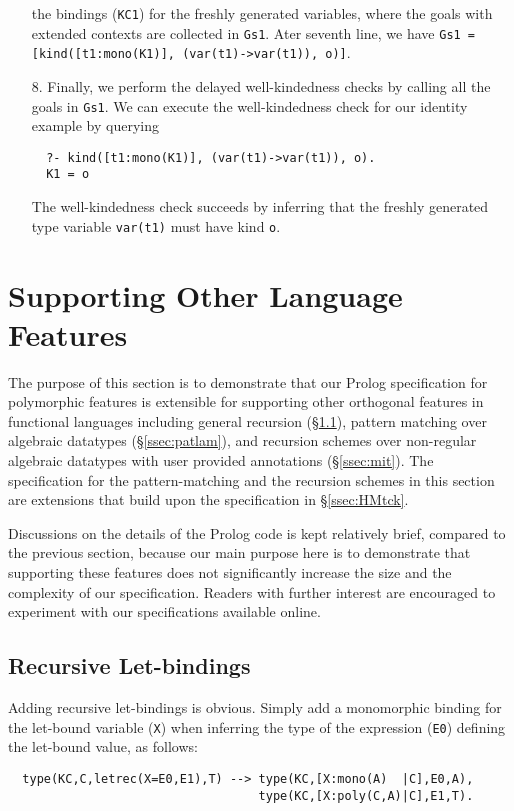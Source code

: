 \documentclass[runningheads,a4paper]{llncs}
\begin{document}
\begin{itemize}
the bindings (\verb|KC1|) for the freshly generated variables, 
where the goals with extended contexts are collected in \verb|Gs1|.
Ater seventh line, we have 
\verb|Gs1 = [kind([t1:mono(K1)], (var(t1)->var(t1)), o)]|.
\item[8.] Finally, we perform the delayed well-kindedness checks by calling
all the goals in \verb|Gs1|. We can execute the well-kindedness check for
our identity example by querying
\begin{verbatim}
  ?- kind([t1:mono(K1)], (var(t1)->var(t1)), o).
  K1 = o
\end{verbatim}
The well-kindedness check succeeds by inferring that the freshly generated
type variable \verb|var(t1)| must have kind \verb|o|.
\end{itemize}

\section{Supporting Other Language Features}\label{sec:other}
The purpose of this section is to demonstrate that our Prolog specification
for polymorphic features is extensible for supporting other orthogonal
features in functional languages including general recursion
(\S\ref{ssec:letrec}), pattern matching over algebraic datatypes
(\S\ref{ssec:patlam}), and recursion schemes over non-regular
algebraic datatypes with user provided annotations (\S\ref{ssec:mit}).
The specification for the pattern-matching and the recursion schemes
in this section are extensions that build upon the specification
in \S\ref{ssec:HMtck}.

Discussions on the details of the Prolog code is kept relatively brief,
compared to the previous section, because our main purpose here is to
demonstrate that supporting these features does not significantly increase
the size and the complexity of our specification. Readers with further
interest are encouraged to experiment with our specifications available
online.

\subsection{Recursive Let-bindings}\label{ssec:letrec}
Adding recursive let-bindings is obvious. Simply add
a monomorphic binding for the let-bound variable (\verb|X|)
when inferring the type of the expression (\verb|E0|) defining
the let-bound value, as follows:
{\small
\begin{verbatim}
  type(KC,C,letrec(X=E0,E1),T) --> type(KC,[X:mono(A)  |C],E0,A),
                                   type(KC,[X:poly(C,A)|C],E1,T).
\end{verbatim} }
\end{document}
